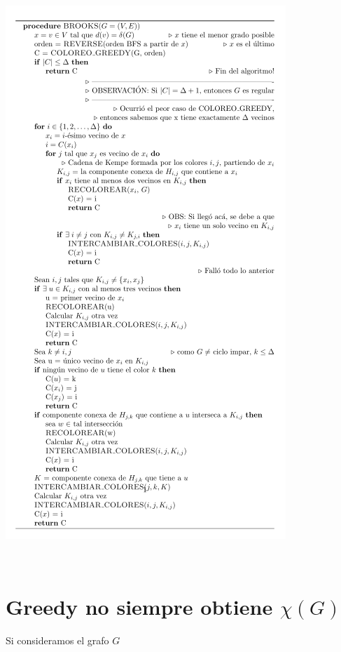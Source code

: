 \documentclass[10pt,a4paper]{article}
\begin{document}
\begin{center}

    \begin{adjustbox}{max size={\textwidth}{\textheight}}
        \includegraphics{definitions/algo_brooks.png}
        \end{adjustbox}
    
\end{center}

 

\section*{Greedy no siempre obtiene $\chi(G)$}

Si consideramos el grafo $G$
\end{document}
